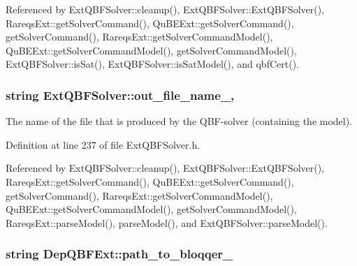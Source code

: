 Referenced by Ext\-Q\-B\-F\-Solver\-::cleanup(), Ext\-Q\-B\-F\-Solver\-::\-Ext\-Q\-B\-F\-Solver(), Rareqs\-Ext\-::get\-Solver\-Command(), Qu\-B\-E\-Ext\-::get\-Solver\-Command(), get\-Solver\-Command(), Rareqs\-Ext\-::get\-Solver\-Command\-Model(), Qu\-B\-E\-Ext\-::get\-Solver\-Command\-Model(), get\-Solver\-Command\-Model(), Ext\-Q\-B\-F\-Solver\-::is\-Sat(), Ext\-Q\-B\-F\-Solver\-::is\-Sat\-Model(), and qbf\-Cert().

\hypertarget{classExtQBFSolver_a0efb35aa9b807dec521ad3406eaf664d}{
\subsubsection[{out\-\_\-file\-\_\-name\-\_\-}]{\setlength{\rightskip}{0pt plus 5cm}string Ext\-Q\-B\-F\-Solver\-::out\-\_\-file\-\_\-name\-\_\-\hspace{0.3cm}{\ttfamily [protected]}, {\ttfamily [inherited]}}}\label{classExtQBFSolver_a0efb35aa9b807dec521ad3406eaf664d}


The name of the file that is produced by the Q\-B\-F-\/solver (containing the model). 



Definition at line 237 of file Ext\-Q\-B\-F\-Solver.\-h.



Referenced by Ext\-Q\-B\-F\-Solver\-::cleanup(), Ext\-Q\-B\-F\-Solver\-::\-Ext\-Q\-B\-F\-Solver(), Rareqs\-Ext\-::get\-Solver\-Command(), Qu\-B\-E\-Ext\-::get\-Solver\-Command(), get\-Solver\-Command(), Rareqs\-Ext\-::get\-Solver\-Command\-Model(), Qu\-B\-E\-Ext\-::get\-Solver\-Command\-Model(), get\-Solver\-Command\-Model(), Rareqs\-Ext\-::parse\-Model(), parse\-Model(), and Ext\-Q\-B\-F\-Solver\-::parse\-Model().

\hypertarget{classDepQBFExt_a76b0152b808bde17a2a1324979f82106}{
\subsubsection[{path\-\_\-to\-\_\-bloqqer\-\_\-}]{\setlength{\rightskip}{0pt plus 5cm}string Dep\-Q\-B\-F\-Ext\-::path\-\_\-to\-\_\-bloqqer\-\_\-\hspace{0.3cm}{\ttfamily [protected]}}}\label{classDepQBFExt_a76b0152b808bde17a2a1324979f82106}


